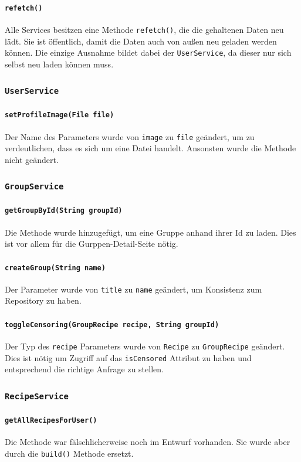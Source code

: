 \documentclass{implementierungsheft}
\begin{document}
\paragraph{\texttt{refetch()}}
Alle Services besitzen eine Methode \texttt{refetch()}, die die gehaltenen Daten neu lädt. Sie ist öffentlich, damit die Daten auch von außen neu geladen werden können. Die einzige Ausnahme bildet dabei der \texttt{UserService}, da dieser nur sich selbst neu laden können muss.
\subsubsection{\texttt{UserService}}
\paragraph*{\texttt{setProfileImage(File file)}}
Der Name des Parameters wurde von \texttt{image} zu \texttt{file} geändert, um zu verdeutlichen, dass es sich um eine Datei handelt. Ansonsten wurde die Methode nicht geändert.
\subsubsection{\texttt{GroupService}}
\paragraph*{\texttt{getGroupById(String groupId)}}
Die Methode wurde hinzugefügt, um eine Gruppe anhand ihrer Id zu laden. Dies ist vor allem für die Gurppen-Detail-Seite nötig.
\paragraph{\texttt{createGroup(String name)}}
Der Parameter wurde von \texttt{title} zu \texttt{name} geändert, um Konsistenz zum Repository zu haben.
\paragraph{\texttt{toggleCensoring(GroupRecipe recipe, String groupId)}}
Der Typ des \texttt{recipe} Parameters wurde von \texttt{Recipe} zu \texttt{GroupRecipe} geändert. Dies ist nötig um Zugriff auf das \texttt{isCensored} Attribut zu haben und entsprechend die richtige Anfrage zu stellen.
\subsubsection{\texttt{RecipeService}}
\paragraph{\texttt{getAllRecipesForUser()}}
Die Methode war fälschlicherweise noch im Entwurf vorhanden. Sie wurde aber durch die \texttt{build()} Methode ersetzt.
\end{document}
